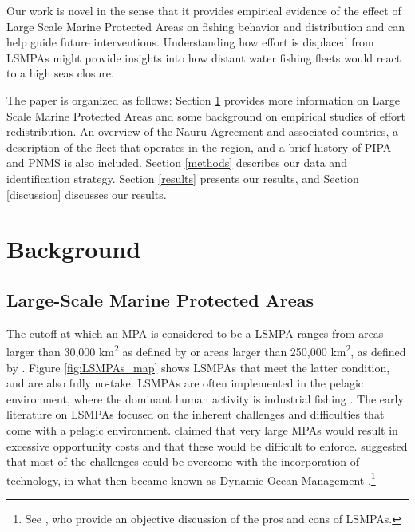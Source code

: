 \documentclass[9pt,twoside,lineno]{pnas-new}
\begin{document}
Our work is novel in the sense that it provides empirical evidence of
the effect of Large Scale Marine Protected Areas on fishing behavior and
distribution and can help guide future interventions. Understanding how
effort is displaced from LSMPAs might provide insights into how distant water fishing fleets would react to a high seas closure.

The paper is organized as follows: Section \ref{background} provides more
information on Large Scale Marine Protected Areas and some background on
empirical studies of effort redistribution. An overview of the Nauru
Agreement and associated countries, a description of the fleet that
operates in the region, and a brief history of PIPA and PNMS is also included.
Section \ref{methods} describes our data and identification strategy.
Section \ref{results} presents our results, and Section \ref{discussion}
discusses our
results.

\section{Background}\label{background}

\subsection{Large-Scale Marine Protected Areas}\label{lsmpas}

The cutoff at which an MPA is considered to be a LSMPA ranges from areas
larger than 30,000 km\textsuperscript{2} as defined by
\cite{desanto_2013} or areas larger than 250,000 km\textsuperscript{2},
as defined by \cite{toonen_2013}. Figure \ref{fig:LSMPAs_map} shows
LSMPAs that meet the latter condition, and are also fully no-take. LSMPAs are often
implemented in the pelagic environment, where the dominant human
activity is industrial fishing \cite{gray_2017,kroodsma_2018}. The
early literature on LSMPAs focused on the inherent challenges and
difficulties that come with a pelagic environment. \cite{kaplan_2010}
claimed that very large MPAs would result in excessive opportunity costs
and that these would be difficult to enforce. \cite{game_2009}
suggested that most of the challenges could be overcome with the
incorporation of technology, in what then became known as Dynamic Ocean
Management \citep{maxwell_2015}.\footnote{See \cite{singleton_2014}, who provide an objective discussion of the pros and cons of LSMPAs.} 
\end{document}
